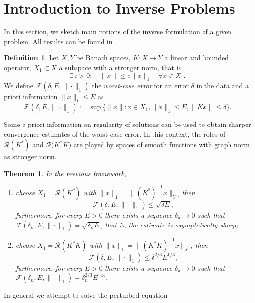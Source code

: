 \documentclass[10pt, a4paper, twoside, openright]{book}
\theoremstyle{definition}
\newtheorem{definition}[subsection]{Definition}
\theoremstyle{plain}
\newtheorem{theorem}[subsection]{Theorem}
\theoremstyle{plain}
\theoremstyle{plain}
\theoremstyle{plain}
\theoremstyle{plain}
\theoremstyle{plain}
\theoremstyle{plain}
\theoremstyle{plain}
\begin{document}
\section{Introduction to Inverse Problems}
In this section, we sketch main notions of the inverse formulation of a given problem. All results 
can be found in \cite{kirsch:book}.
\begin{definition}
 Let $X,Y$ be Banach spaces, $K:X\to Y$ a linear and bounded operator, $X_1\subset X$ a subspace with a stronger norm, that is
 \begin{equation}
  \exists \, c>0:\quad \|x\|\leq c\|x\|_1\quad\forall x\in X_1.
 \end{equation}
 We define $\mathcal{F}(\delta, E, \|\cdot\|_1)$ the \emph{worst-case error} for an error $\delta$ in the data and a priori information $\|x\|_1\leq E$ as
 \begin{equation}
  \mathcal{F}(\delta, E, \|\cdot\|_1):= \sup\Big\{\|x\|:x\in X_1, \|x\|_1 \leq E, \|Kx\|\leq\delta\Big\}.
 \end{equation}
\end{definition}
Some a priori information on regularity of solutions can be used to obtain sharper convergence estimates of the worst-case error. 
In this context, the roles of $\mathcal{R}(K^*)$ and $\mathcal{R}({K^*K)}$ are played by spaces of smooth functions with graph norm as stronger norm.
\begin{theorem}
 In the previous framework,
 \begin{enumerate}
  \item choose $X_1=\mathcal{R}(K^*)$ with $\|x\|_1=\|(K^*)^{-1}x\|_Y$, then
  \begin{equation}
   \mathcal{F}(\delta, E, \|\cdot\|_1)\leq \sqrt{\delta E},
  \end{equation}
  furthermore, for every $E>0$ there exists a sequence $\delta_n\to 0$ such that $\mathcal{F}(\delta_n, E, \|\cdot\|_1) = \sqrt{\delta_n E}$, that is, the estimate is asymptotically sharp;
  \item choose $X_1=\mathcal{R}(K^*K)$ with $\|x\|_1=\|(K^*K)^{-1}x\|_X$, then
  \begin{equation}
   \mathcal{F}(\delta, E, \|\cdot\|_1)\leq \delta^{2/3} E^{1/3},
  \end{equation}
  furthermore, for every $E>0$ there exists a sequence $\delta_n\to 0$ such that $\mathcal{F}(\delta_n, E, \|\cdot\|_1) = \delta_n^{2/3} E^{1/3}$.
 \end{enumerate}
\end{theorem}
In general we attempt to solve the perturbed equation
\end{document}
